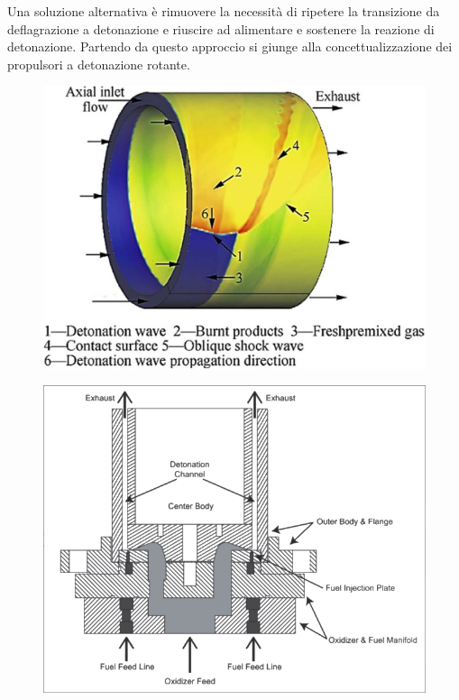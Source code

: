 \begin{frame}
  Una soluzione alternativa è rimuovere la necessità di ripetere la transizione da deflagrazione a detonazione e riuscire ad alimentare e sostenere la reazione di detonazione. Partendo da questo approccio si giunge alla concettualizzazione dei propulsori a detonazione rotante.
\begin{figure}[H]
\centering
\includegraphics[scale=.6]{rde_intro.png} %
\end{figure}
\end{frame}
\begin{frame}
  \begin{figure}[H]
\centering
\includegraphics[scale=.2]{cross_rde.png}
\end{figure} 
\end{frame}


